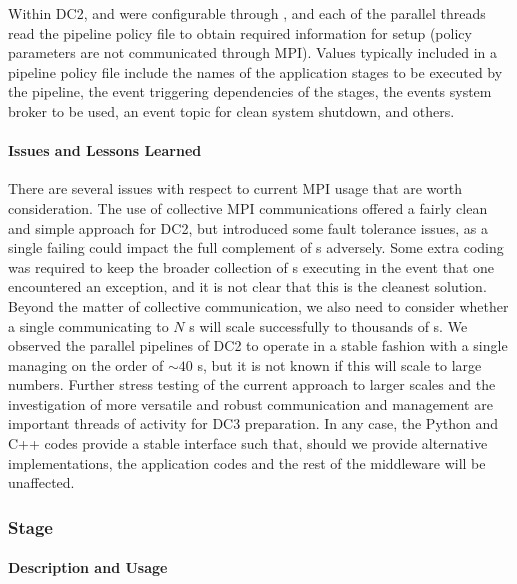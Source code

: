 Within DC2,  and  were configurable through , and each of the parallel threads 
read the pipeline policy file to obtain required information for setup (policy parameters are 
not communicated through MPI).  Values typically included in a pipeline policy file include the 
names of the application stages to be executed  by the pipeline, the event triggering dependencies 
of the stages, the events system broker to be used, an event topic for clean system shutdown,
and others. 

\paragraph{Issues and Lessons Learned}

There are several issues with respect to current MPI usage that are worth consideration.
The use of collective MPI communications offered a fairly clean and simple approach for DC2, 
but introduced some fault tolerance issues, as a single  failing could impact the full 
complement of s adversely.   Some extra coding was required to keep the broader 
collection of s  executing in the event that one  
encountered an exception, and it  is not clear that this is the cleanest solution.
Beyond the matter of collective communication, we also need to consider whether a single 
communicating to $ N $  s will scale successfully to thousands of s. 
We observed the parallel pipelines of DC2 to operate in a stable fashion with a single  
managing on  the order of $\sim40$ s, but it is not known if this will scale to large numbers. 
Further stress testing of the current approach to larger scales and the investigation of more 
versatile and robust communication and  management are important threads of activity for
DC3 preparation. In any case, the  Python and C++ codes provide a stable interface
such that, should we provide alternative implementations, the application codes and the
rest of the middleware will be unaffected.

\subsubsection{Stage}

\paragraph{Description and Usage}

